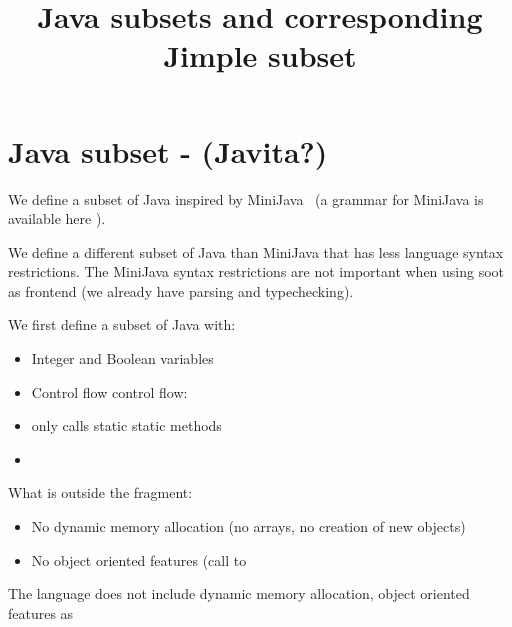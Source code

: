 \documentclass{report}
\newcommand{\minijava}{MiniJava\xspace}
\begin{document}
\title{Java subsets and corresponding Jimple subset}

\maketitle



\section{Java subset - (Javita?)}
We define a subset of Java inspired by \minijava~\cite{} (a grammar
for \minijava is available here \label{sec:minijava}).

We define a different subset of Java than \minijava that has less
language syntax restrictions.
%
The \minijava syntax restrictions are not important when using soot as
frontend (we already have parsing and typechecking).

We first define a subset of Java with:
\begin{itemize}
\item Integer and Boolean variables
\item Control flow  control flow: 
\item only calls static static methods
\item 
\end{itemize} 

What is outside the fragment:
\begin{itemize}
\item No dynamic memory allocation (no arrays, no creation of new
  objects)
\item No object oriented features (call to 
\end{itemize}
The language does not include dynamic memory allocation, object
oriented features as 
\end{document}
